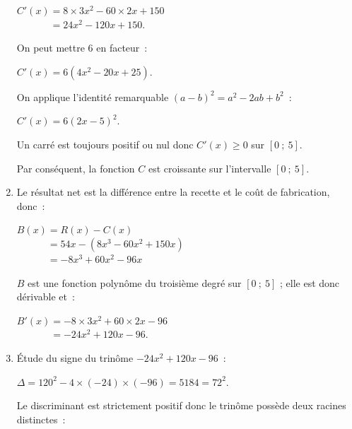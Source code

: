 \begin{corrige}
\begin{enumerate}
          \par
          $C'(x)= 8 \times 3x^2 - 60 \times 2x + 150$\\
          $\phantom{C'(x)}= 24x^2 - 120x + 150.$
          \par
          On peut mettre $6$ en facteur~:
          \par
          $C'(x)= 6(4x^2-20x+25)$.
          \par
          On applique l'identité remarquable $(a-b)^2=a^2-2ab+b^2$~:
          \par
          $C'(x)= 6(2x-5)^2$.
          \par
          Un carré est toujours positif ou nul donc $C'(x) \geqslant 0$ sur $[0~;~5]$.
          \par
          Par conséquent, la fonction $C$ est croissante sur l'intervalle $[0~;~5]$.
          \par
          \par
          \item
          Le résultat net est la différence entre la recette et le coût de fabrication, donc~:
          \par
          $B(x)=R(x)-C(x)$\\
          $\phantom{B(x)}=54x-(8x^3-60x^2+150x)$\\
          $\phantom{B(x)}=-8x^3+60x^2-96x$
          \par
          $B$ est une fonction polynôme du troisième degré sur $[0~;~5]$ ; elle est donc dérivable et~:
          \par
          $B'(x)=-8\times 3x^2+60\times 2x-96$\\
          $\phantom{B'(x)}=-24x^2+120x-96$.
          \par
          \item \'Etude du signe du trinôme $-24x^2+120x-96$~:
          \par
          $\Delta=120^2-4 \times (-24)\times (-96)=5184=72^2$.
          \par
          Le discriminant est strictement positif donc le trinôme possède deux racines distinctes~:
          \par

\end{enumerate}
\end{corrige}
